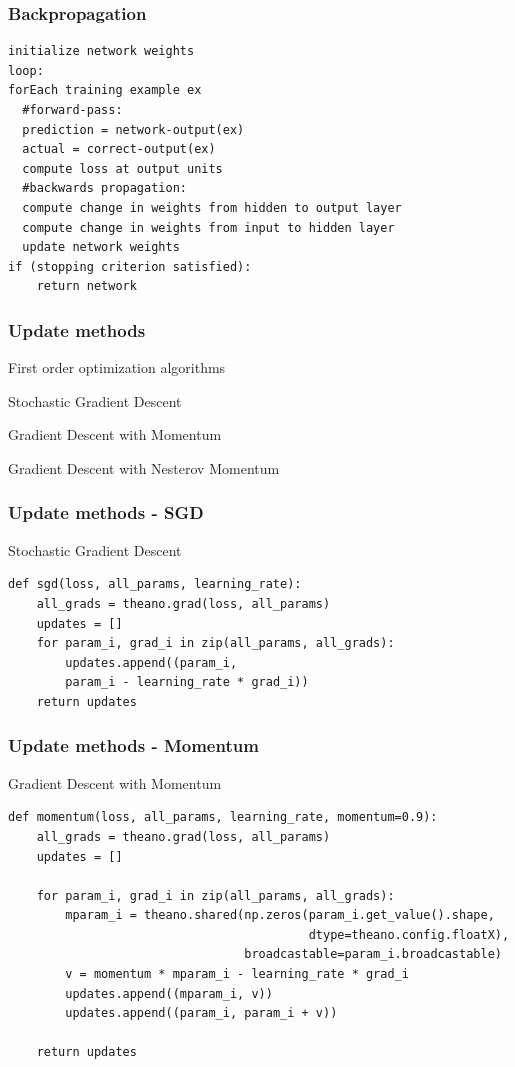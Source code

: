 \documentclass{beamer}
\begin{document}
\begin{frame}[fragile]
\frametitle{Backpropagation}
\begin{verbatim}
initialize network weights
loop:
forEach training example ex
  #forward-pass:
  prediction = network-output(ex)
  actual = correct-output(ex)
  compute loss at output units
  #backwards propagation:
  compute change in weights from hidden to output layer
  compute change in weights from input to hidden layer
  update network weights
if (stopping criterion satisfied):
    return network
\end{verbatim}
\end{frame}

\begin{frame}
    \frametitle{Update methods}
    \begin{block}{First order optimization algorithms}
    \item Stochastic Gradient Descent
    \item Gradient Descent with Momentum
    \item Gradient Descent with Nesterov Momentum
    \end{block}
\end{frame}

\begin{frame}[fragile]
    \frametitle{Update methods - SGD}
    \begin{block}{Stochastic Gradient Descent}
    \begin{verbatim}
def sgd(loss, all_params, learning_rate):
    all_grads = theano.grad(loss, all_params)
    updates = []
    for param_i, grad_i in zip(all_params, all_grads):
        updates.append((param_i,
        param_i - learning_rate * grad_i))
    return updates
    \end{verbatim}
\end{block}

\end{frame}

\begin{frame}[fragile]
    \frametitle{Update methods - Momentum}
    \begin{block}{Gradient Descent with Momentum}
    \begin{verbatim}
def momentum(loss, all_params, learning_rate, momentum=0.9):
    all_grads = theano.grad(loss, all_params)
    updates = []

    for param_i, grad_i in zip(all_params, all_grads):
        mparam_i = theano.shared(np.zeros(param_i.get_value().shape,
                                          dtype=theano.config.floatX),
                                 broadcastable=param_i.broadcastable)
        v = momentum * mparam_i - learning_rate * grad_i
        updates.append((mparam_i, v))
        updates.append((param_i, param_i + v))

    return updates
    \end{verbatim}
\end{block}
\end{frame}
\end{document}
